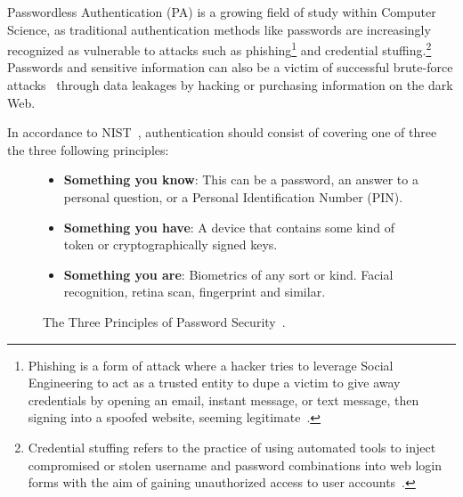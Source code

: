 Passwordless Authentication (PA) is a growing field of study within Computer
Science, as traditional authentication methods like passwords are increasingly
recognized as vulnerable to attacks such as phishing\footnote{
  Phishing is a form of attack where a hacker tries to leverage Social
  Engineering to act as a trusted entity to dupe a victim to give away
  credentials by opening an email, instant message, or text message, then
  signing into a spoofed website, seeming legitimate~\cite{ripa2021emergence}.
} and credential stuffing.\footnote{
  Credential stuffing refers to the practice of using automated tools to
  inject compromised or stolen username and password combinations into web login
  forms with the aim of gaining unauthorized access to user
  accounts~\cite{owasp-credential-stuffing}.
}
Passwords and sensitive information can also be a victim of successful
brute-force attacks~\cite{bonneau2012science} through data leakages by hacking
or purchasing information on the dark Web.

In accordance to NIST~\cite{NIST:SP:800-171r2}, authentication should consist of
covering one of three the three following principles:

\begin{figure}[htbp]
  \begin{itemize}
    \item \textbf{Something you know}:
      This can be a password, an answer to a personal question, or a Personal
      Identification Number (PIN).
    \item \textbf{Something you have}:
      A device that contains some kind of token or cryptographically signed keys.
    \item \textbf{Something you are}:
      Biometrics of any sort or kind.
    Facial recognition, retina scan, fingerprint and similar.
  \end{itemize}
  \caption{The Three Principles of Password Security~\cite{schneier2000secrets, NIST:SP:800-171r2}.}
  \label{fig:secprinciples}

\end{figure}

